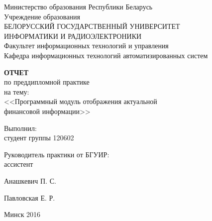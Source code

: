 \begin{titlepage}
\thispagestyle{empty}
\setlength{\parindent}{0mm} %

\begin{center}
  Министерство образования Республики Беларусь \\
  \smallskip
  Учреждение образования \\
  БЕЛОРУССКИЙ ГОСУДАРСТВЕННЫЙ УНИВЕРСИТЕТ \\
  ИНФОРМАТИКИ И РАДИОЭЛЕКТРОНИКИ \\
  \smallskip
  Факультет информационных технологий и управления \\
  \smallskip
  Кафедра информационных технологий автоматизированных систем
\end{center}

\vspace{40mm}

\begin{center}
  \textbf{ОТЧЕТ} \\
  по преддипломной практике \\
  на тему: \\
  <<Программный модуль отображения актуальной \\ финансовой информации>>
\end{center}

\vspace{30mm}

\begin{minipage}{.7\linewidth}
    Выполнил: \\
    студент группы 120602

    \bigskip

    Руководитель практики от БГУИР: \\
    ассистент
\end{minipage}
\hfill
\begin{minipage}{.25\linewidth}
  \vspace{6mm}
  Анашкевич П. С.

  \vspace{12mm}
  Павловская Е. Р.
\end{minipage}

\vfill

\begin{center}
  Минск 2016
\end{center}

\setlength{\parindent}{1.25cm} %
\end{titlepage}
